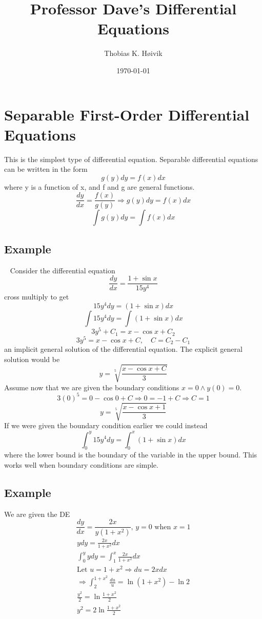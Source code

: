 \documentclass[12pt]{article}
\title{Professor Dave's Differential Equations}
\author{Thobias K. Høivik}
\date{\today}
\begin{document}
\maketitle
\section*{Separable First-Order Differential Equations}
This is the simplest type of differential equation. 
Separable differential equations can be written in the form 
\[ 
    g(y)dy = f(x)dx
\]
where y is a function of x, and f and g are general functions.
\[ 
    \frac{dy}{dx} = \frac{f(x)}{g(y)} \Rightarrow g(y)dy = f(x)dx
\]
\[ 
    \displaystyle\int g(y)dy = \displaystyle\int f(x)dx
\]

\subsection*{Example} 
Consider the differential equation 
\[ 
    \frac{dy}{dx} = \frac{1 + \sin x}{15y^4}
\]
cross multiply to get
\[ 
    15y^4 dy = (1+\sin x) dx
\]
\[ 
    \displaystyle\int15y^4 dy = \displaystyle\int(1+\sin x) dx
\]
\[ 
    3y^5 + C_1 = x - \cos x + C_2  
\]
\[ 
    3y^5 = x - \cos x + C, \quad C = C_2 - C_1
\]
an implicit general solution of the differential equation. 
The explicit general solution would be 
\[ 
    \boxed {y = \sqrt[5]{\frac{x-\cos x + C}{3}}}
\]
Assume now that we are given the boundary conditions \(x = 0 \land y(0)=0\).
\[ 
    3(0)^5 = 0 - \cos 0 + C \Rightarrow 0 = -1 + C \Rightarrow C = 1
\]
\[ 
    \boxed {y = \sqrt[5]{\frac{x-\cos x + 1}{3}}}
\]
If we were given the boundary condition earlier we could instead 
\[ 
    \displaystyle\int_{0}^{y}15y^4 dy = \displaystyle\int_{0}^{x} (1 + \sin x)dx
\]
where the lower bound is the boundary of the variable in the upper bound. 
This works well when boundary conditions are simple. 
 
\subsection*{Example} 
We are given the DE 
\[ 
    \frac{dy}{dx} = \frac{2x}{y(1+x^2)} \text{, } y = 0 \text{ when } x = 1
\]
\begin{gather*}
    y dy = \frac{2x}{1+x^2} dx \\ 
    \displaystyle\int_{0}^{y} y dy = \displaystyle\int_1^x \frac{2x}{1+x^2} dx \\ 
    \text{Let } u = 1+x^2 \Rightarrow du = 2xdx \\ 
    \Rightarrow \displaystyle\int_{2}^{1+x^2} \frac{du}{u} = \ln(1+x^2)-\ln 2 \\
    \frac{y^2}{2} = \ln \frac{1+x^2}{2} \\ 
    \boxed {y^2 = 2\ln \frac{1+x^2}{2} }
\end{gather*}
\end{document}
